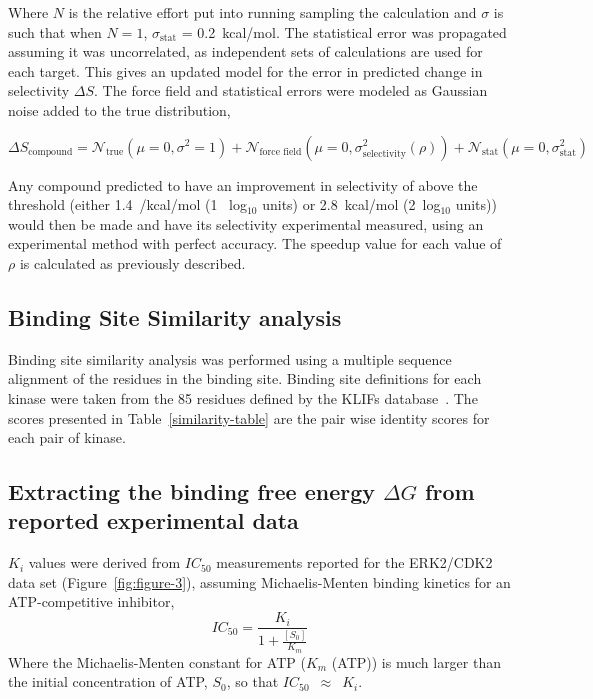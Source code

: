 \documentclass[phd,tocprelim]{cornell}
\begin{document}
Where $N$ is the relative effort put into running sampling the calculation and $\sigma$ is such that when $N = 1$, $\sigma_\text{stat}$ = 0.2~kcal/mol. 
The statistical error was propagated assuming it was uncorrelated, as independent sets of calculations are used for each target. This gives an updated model for the error in predicted change in selectivity $\Delta S$. The force field and statistical errors were modeled as Gaussian noise added to the true distribution, 

\begin{equation}\label{stat_error}
\Delta S_\text{compound} = \mathcal{N}_\text{true}(\mu =0, \sigma^2 = 1) + \mathcal{N}_\text{force field}(\mu =0, \sigma_\text{selectivity}^2(\rho)) + \mathcal{N}_\text{stat}(\mu =0, \sigma_\text{stat}^2)
\end{equation}

Any compound predicted to have an improvement in selectivity of above the threshold (either 1.4~/kcal/mol (1 ~log$_{10}$ units) or 2.8~kcal/mol (2~log$_{10}$ units)) would then be made and have its selectivity experimental measured, using an experimental method with perfect accuracy. 
The speedup value for each value of $\rho$ is calculated as previously described. 

\subsection{Binding Site Similarity analysis}
Binding site similarity analysis was performed using a multiple sequence alignment of the residues in the binding site. Binding site definitions for each kinase were taken from the 85 residues defined by the KLIFs database~\citep{Kooistra:2016fr}. The scores presented in Table~\ref{similarity-table} are the pair wise identity scores for each pair of kinase. 

\subsection{Extracting the binding free energy $\Delta G$ from reported experimental data}

$K_i$ values were derived from $IC_{50}$ measurements reported for the ERK2/CDK2 data set (Figure~\ref{fig:figure-3}), assuming Michaelis-Menten binding kinetics for an ATP-competitive inhibitor,
\begin{equation}\label{ki_ic50}
IC_{50} = \frac{K_i}{1 + \frac{[S_0]}{K_m}}
\end{equation}
Where the Michaelis-Menten constant for ATP ($K_m$ (ATP)) is much larger than the initial concentration of ATP, $S_0$, so that $IC_{50}$~$\approx$~$K_i$. 
\end{document}
